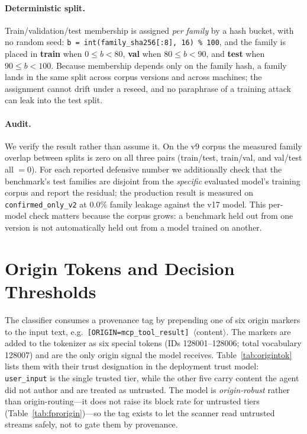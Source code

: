 \documentclass{article}
\begin{document}
\paragraph{Deterministic split.} Train/validation/test membership is assigned \emph{per family} by a hash bucket, with no random seed: \texttt{b = int(family\_sha256[:8], 16) \% 100}, and the family is placed in \textbf{train} when $0 \le b < 80$, \textbf{val} when $80 \le b < 90$, and \textbf{test} when $90 \le b < 100$. Because membership depends only on the family hash, a family lands in the same split across corpus versions and across machines; the assignment cannot drift under a reseed, and no paraphrase of a training attack can leak into the test split.

\paragraph{Audit.} We verify the result rather than assume it. On the v9 corpus the measured family overlap between splits is zero on all three pairs (train/test, train/val, and val/test all $=0$). For each reported defensive number we additionally check that the benchmark's test families are disjoint from the \emph{specific} evaluated model's training corpus and report the residual; the production result is measured on \texttt{confirmed\_only\_v2} at $0.0\%$ family leakage against the v17 model. This per-model check matters because the corpus grows: a benchmark held out from one version is not automatically held out from a model trained on another.

\section{Origin Tokens and Decision Thresholds}

The classifier consumes a provenance tag by prepending one of six origin markers to the input text, e.g.\ \texttt{[ORIGIN=mcp\_tool\_result]}~$\langle$content$\rangle$. The markers are added to the tokenizer as six special tokens (IDs 128001--128006; total vocabulary 128007) and are the only origin signal the model receives. Table~\ref{tab:origintok} lists them with their trust designation in the deployment trust model: \texttt{user\_input} is the single trusted tier, while the other five carry content the agent did not author and are treated as untrusted. The model is \emph{origin-robust} rather than origin-routing---it does not raise its block rate for untrusted tiers (Table~\ref{tab:fprorigin})---so the tag exists to let the scanner read untrusted streams safely, not to gate them by provenance.
\end{document}
